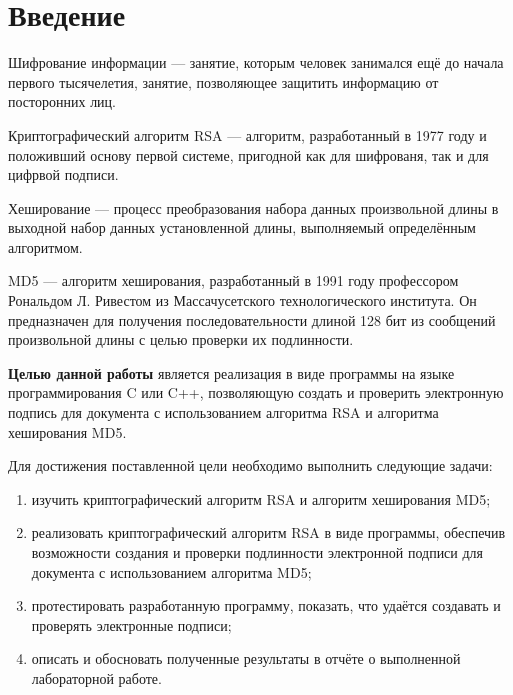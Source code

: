 \chapter*{Введение}

Шифрование информации --- занятие, которым человек занимался ещё до начала первого тысячелетия, занятие, позволяющее защитить информацию от посторонних лиц. 

Криптографический алгоритм RSA --- алгоритм, разработанный в 1977 году и положивший основу первой системе, пригодной как для шифрованя, так и для цифрвой подписи.

Хеширование --- процесс преобразования набора данных произвольной длины в выходной набор данных установленной длины, выполняемый определённым алгоритмом.

MD5 --- алгоритм хеширования, разработанный в 1991 году профессором Рональдом Л. Ривестом из Массачусетского технологического института. 
Он предназначен для получения последовательности длиной 128 бит из сообщений произвольной длины с целью проверки их подлинности.

\textbf{Целью данной работы} является реализация в виде программы на языке программирования C или C++, позволяющую создать и проверить электронную подпись для документа с использованием алгоритма RSA и алгоритма хеширования MD5.

Для достижения поставленной цели необходимо выполнить следующие задачи:
\begin{enumerate}[label=\arabic*)]
	\item изучить криптографический алгоритм RSA и алгоритм хеширования MD5;
    \item реализовать криптографический алгоритм RSA в виде программы, обеспечив возможности создания и проверки подлинности электронной подписи для документа с использованием алгоритма MD5;
	\item протестировать разработанную программу, показать, что удаётся создавать и проверять электронные подписи;
	\item описать и обосновать полученные результаты в отчёте о выполненной лабораторной работе.
\end{enumerate}
